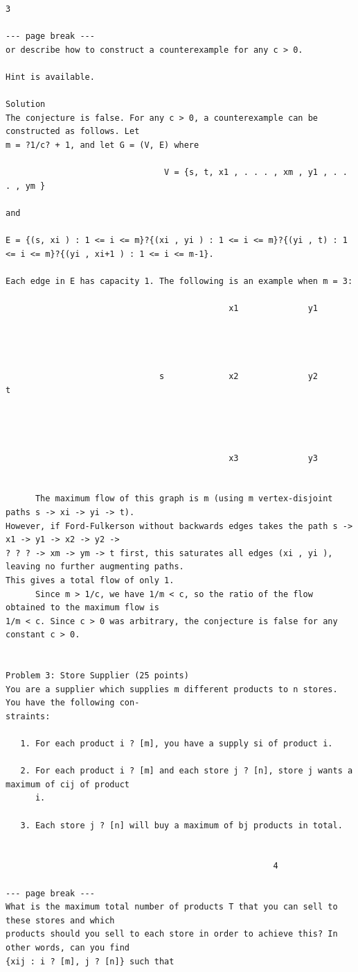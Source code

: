 \documentclass[12pt]{article}
\begin{document}
\begin{Verbatim}[breaklines=true,fontsize=\small]
                                                                   3

--- page break ---
or describe how to construct a counterexample for any c > 0.

Hint is available.

Solution
The conjecture is false. For any c > 0, a counterexample can be constructed as follows. Let
m = ?1/c? + 1, and let G = (V, E) where

                                V = {s, t, x1 , . . . , xm , y1 , . . . , ym }

and

E = {(s, xi ) : 1 <= i <= m}?{(xi , yi ) : 1 <= i <= m}?{(yi , t) : 1 <= i <= m}?{(yi , xi+1 ) : 1 <= i <= m-1}.

Each edge in E has capacity 1. The following is an example when m = 3:

                                             x1              y1




                               s             x2              y2                  t




                                             x3              y3


      The maximum flow of this graph is m (using m vertex-disjoint paths s -> xi -> yi -> t).
However, if Ford-Fulkerson without backwards edges takes the path s -> x1 -> y1 -> x2 -> y2 ->
? ? ? -> xm -> ym -> t first, this saturates all edges (xi , yi ), leaving no further augmenting paths.
This gives a total flow of only 1.
      Since m > 1/c, we have 1/m < c, so the ratio of the flow obtained to the maximum flow is
1/m < c. Since c > 0 was arbitrary, the conjecture is false for any constant c > 0.


Problem 3: Store Supplier (25 points)
You are a supplier which supplies m different products to n stores. You have the following con-
straints:

   1. For each product i ? [m], you have a supply si of product i.

   2. For each product i ? [m] and each store j ? [n], store j wants a maximum of cij of product
      i.

   3. Each store j ? [n] will buy a maximum of bj products in total.


                                                      4

--- page break ---
What is the maximum total number of products T that you can sell to these stores and which
products should you sell to each store in order to achieve this? In other words, can you find
{xij : i ? [m], j ? [n]} such that


\end{Verbatim}
\end{document}

